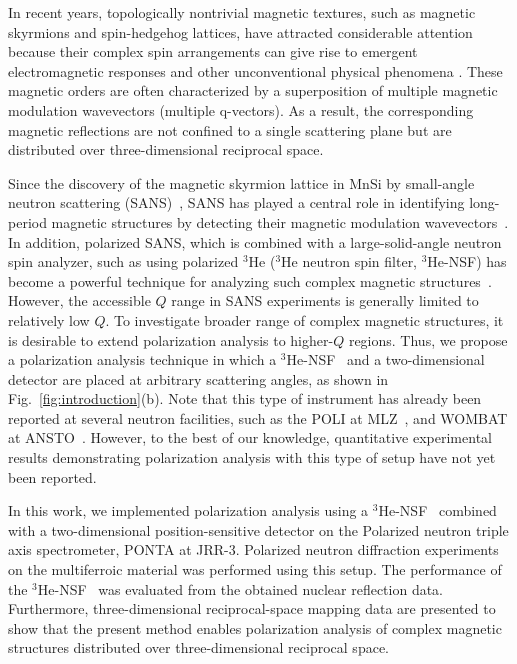 \documentclass[%
 reprint,
superscriptaddress,
 amsmath,amssymb,
 aps,
]{revtex4-2}
\newcommand{\He}{$^3$He }
\newcommand{\Hensf}{$^3$He-NSF}
\begin{document}
In recent years, topologically nontrivial magnetic textures, such as magnetic skyrmions and spin-hedgehog lattices, have attracted considerable attention because their complex spin arrangements can give rise to emergent electromagnetic responses and other unconventional physical phenomena \cite{muhlbauer_skyrmion_2009,tokura_multiferroics_2014}.
These magnetic orders are often characterized by a superposition of multiple magnetic modulation wavevectors (multiple q-vectors).
As a result, the corresponding magnetic reflections are not confined to a single scattering plane but are distributed over three-dimensional reciprocal space.

Since the discovery of the magnetic skyrmion lattice in MnSi by small-angle neutron scattering (SANS)~\cite{muhlbauer_skyrmion_2009}, SANS has played a central role in identifying long-period magnetic structures by detecting their magnetic modulation wavevectors~\cite{kanazawa_direct_2020, fujishiro_topological_2019,kurumaji_electronic_2025}.
In addition, polarized SANS, which is combined with a large-solid-angle neutron spin analyzer, such as using polarized \He (\He neutron spin filter, \Hensf) has become a powerful technique for analyzing such complex magnetic structures~\cite{singh_transition_2023,takagi_multiple-q_2018}.
However, the accessible \(Q\) range in SANS experiments is generally limited to relatively low \(Q\).
To investigate broader range of complex magnetic structures, it is desirable to extend polarization analysis to higher-\(Q\) regions.
Thus, we propose a polarization analysis technique in which a \Hensf~ and a two-dimensional detector are placed at arbitrary scattering angles, as shown in Fig.~\ref{fig:introduction}(b).
Note that this type of instrument has already been reported at several neutron facilities, such as the POLI at MLZ~\cite{thoma_polarized_2018}, and WOMBAT at ANSTO~\cite{lee_polarised_2016}.
However, to the best of our knowledge, quantitative experimental results demonstrating polarization analysis with this type of setup have not yet been reported.

In this work, we implemented polarization analysis using a \Hensf~ combined with a two-dimensional position-sensitive detector on the Polarized neutron triple axis spectrometer, PONTA at JRR-3.
Polarized neutron diffraction experiments on the multiferroic material  was performed using this setup.
The performance of the \Hensf~ was evaluated from the obtained nuclear reflection data.
Furthermore, three-dimensional reciprocal-space mapping data are presented to show that the present method enables polarization analysis of complex magnetic structures distributed over three-dimensional reciprocal space.
\end{document}
